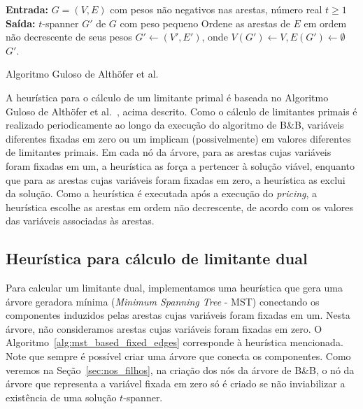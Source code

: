 \medskip

\begin{algorithm}
  \SetAlgoLined
  \textbf{Entrada:} {$G=(V, E)$ com pesos não negativos nas arestas, número real $t \ge 1$}\;
  \textbf{Saída:} {$t$-spanner $G'$ de $G$ com peso pequeno}\;
  Ordene as arestas de $E$ em ordem não decrescente de seus pesos\;
  $G' \gets (V',E')$, onde $V(G') \gets V, E(G') \gets \emptyset$\;
  \Return $G'$.
  \caption{Algoritmo Guloso de Althöfer et al.} 
  \label{alg:greedy_spanner}
\end{algorithm}

A heurística para o cálculo de um limitante primal é baseada no
Algoritmo Guloso de Alth\"{o}fer et al.~\cite{AlthoferDDJS1993}, acima
descrito.  Como o cálculo de limitantes primais é realizado
periodicamente ao longo da execução do algoritmo de B\&B, variáveis
diferentes fixadas em zero ou um implicam (possivelmente) em valores
diferentes de limitantes primais. Em cada nó da árvore, para as arestas
cujas variáveis foram fixadas em um, a heurística as força a pertencer
à solução viável, enquanto que para as arestas cujas variáveis foram
fixadas em zero, a heurística as exclui da solução.  Como a heurística
é executada após a execução do \emph{pricing},
a heurística escolhe as arestas em ordem não decrescente, 
de acordo com os valores das variáveis associadas às arestas.

\subsection{Heurística para cálculo de limitante dual}
Para calcular um limitante dual, implementamos uma heurística que gera
uma árvore geradora mínima (\emph{Minimum Spanning Tree} - MST)
conectando os componentes induzidos pelas arestas cujas variáveis
foram fixadas em um.  Nesta árvore, não consideramos arestas cujas
variáveis foram fixadas em zero. O
Algoritmo~\ref{alg:mst_based_fixed_edges} corresponde à heurística
mencionada. Note que sempre é possível criar uma árvore que conecta os
componentes.  Como veremos na Seção~\ref{sec:nos_filhos}, na criação
dos nós da árvore de B\&B, o nó da árvore que representa a variável
fixada em zero só é criado se não inviabilizar a existência de uma
solução $t$-spanner.

